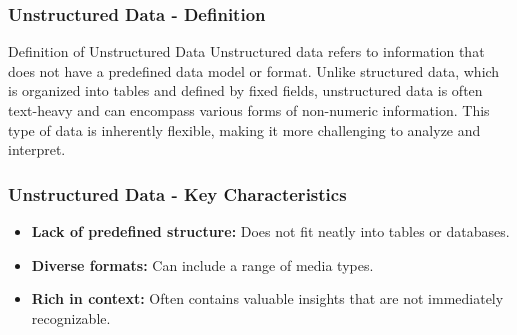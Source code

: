 \documentclass{beamer}
\begin{document}
\begin{frame}[fragile]
    \frametitle{Unstructured Data - Definition}
    \begin{block}{Definition of Unstructured Data}
        Unstructured data refers to information that does not have a predefined data model or format. Unlike structured data, which is organized into tables and defined by fixed fields, unstructured data is often text-heavy and can encompass various forms of non-numeric information. This type of data is inherently flexible, making it more challenging to analyze and interpret.
    \end{block}
\end{frame}

\begin{frame}[fragile]
    \frametitle{Unstructured Data - Key Characteristics}
    \begin{itemize}
        \item \textbf{Lack of predefined structure:} Does not fit neatly into tables or databases.
        \item \textbf{Diverse formats:} Can include a range of media types.
        \item \textbf{Rich in context:} Often contains valuable insights that are not immediately recognizable.
    \end{itemize}
\end{frame}
\end{document}
